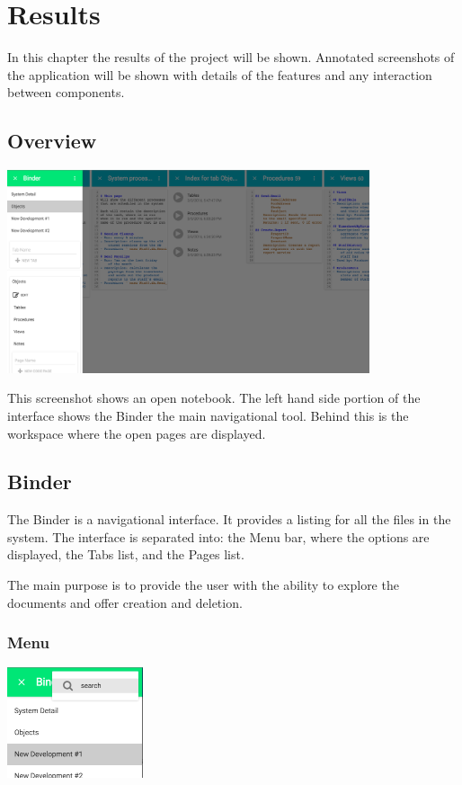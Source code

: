 \chapter{Results}\label{results}

  In this chapter the results of the project will be shown. Annotated screenshots
  of the application will be shown with details of the 
  features and any interaction between components. 

\section{Overview}
\begin{center}
\includegraphics[width=0.8\textwidth]{Figures/Overview.png}
\end{center}

This screenshot shows an open notebook. The left hand side portion of the interface
shows the Binder the main navigational tool. Behind this is the workspace where the open pages
are displayed.

\section{Binder}
The Binder is a navigational interface. It provides a listing for all the files
in the system. The interface is separated into: the Menu bar, where the options are 
displayed, the Tabs list, and the Pages list.

The main purpose is to provide the user with the ability to explore the documents
and offer creation and deletion.

\subsection{Menu}

  \begin{center}
  \includegraphics[width=0.3\textwidth]{Figures/Binder-Menu.png}
  \end{center}

